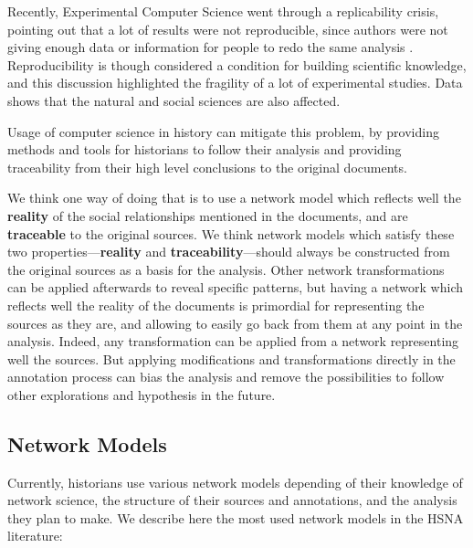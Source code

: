 \documentclass{vgtc}                          %
\begin{document}
Recently, Experimental Computer Science went through a replicability crisis, pointing out that a lot of results were not reproducible, since authors were not giving enough data or information for people to redo the same analysis \cite{baker_1500_2016}. Reproducibility is though considered a condition for building scientific knowledge, and this discussion highlighted the fragility of a lot of experimental studies. Data shows that the natural and social sciences are also affected.

Usage of computer science in history can mitigate this problem, by providing methods and tools for historians to follow their analysis and providing traceability from their high level conclusions to the original documents. 

We think one way of doing that is to use a network model which reflects well the \textbf{reality} of the social relationships mentioned in the documents, and are \textbf{traceable} to the original sources. We think network models which satisfy these two properties---\textbf{reality} and \textbf{traceability}---should always be constructed from the original sources as a basis for the analysis. Other network transformations can be applied afterwards to reveal specific patterns, but having a network which reflects well the reality of the documents is primordial for representing the sources as they are, and allowing to easily go back from them at any point in the analysis. Indeed, any transformation can be applied from a network representing well the sources. But applying modifications and transformations directly in the annotation process can bias the analysis and remove the possibilities to follow other explorations and hypothesis in the future.

\subsection{Network Models}

Currently, historians use various network models depending of their knowledge of network science, the structure of their sources and annotations, and the analysis they plan to make. We describe here the most used network models in the HSNA literature:
\end{document}
